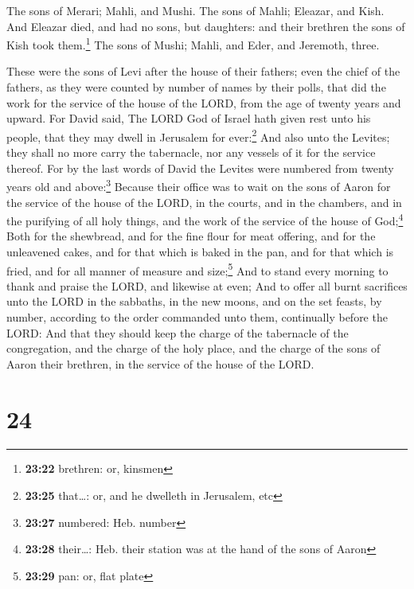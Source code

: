  The sons of Merari; Mahli, and Mushi. The sons of Mahli;
Eleazar, and Kish.  And Eleazar died, and had no sons,
but daughters: and their brethren the sons of Kish took them.\footnote{\textbf{23:22}
  brethren: or, kinsmen}  The sons of Mushi; Mahli, and
Eder, and Jeremoth, three.

 These were the sons of Levi after the house of their
fathers; even the chief of the fathers, as they were counted by number
of names by their polls, that did the work for the service of the house
of the LORD, from the age of twenty years and upward. 
For David said, The LORD God of Israel hath given rest unto his people,
that they may dwell in Jerusalem for ever:\footnote{\textbf{23:25}
  that\ldots: or, and he dwelleth in Jerusalem, etc}  And
also unto the Levites; they shall no more carry the tabernacle, nor any
vessels of it for the service thereof.  For by the last
words of David the Levites were numbered from twenty years old and
above:\footnote{\textbf{23:27} numbered: Heb. number} 
Because their office was to wait on the sons of Aaron for the service of
the house of the LORD, in the courts, and in the chambers, and in the
purifying of all holy things, and the work of the service of the house
of God;\footnote{\textbf{23:28} their\ldots: Heb. their station was at
  the hand of the sons of Aaron}  Both for the shewbread,
and for the fine flour for meat offering, and for the unleavened cakes,
and for that which is baked in the pan, and for that which is fried, and
for all manner of measure and size;\footnote{\textbf{23:29} pan: or,
  flat plate}  And to stand every morning to thank and
praise the LORD, and likewise at even;  And to offer all
burnt sacrifices unto the LORD in the sabbaths, in the new moons, and on
the set feasts, by number, according to the order commanded unto them,
continually before the LORD:  And that they should keep
the charge of the tabernacle of the congregation, and the charge of the
holy place, and the charge of the sons of Aaron their brethren, in the
service of the house of the LORD.

\hypertarget{section-23}{%
\section{24}\label{section-23}}

